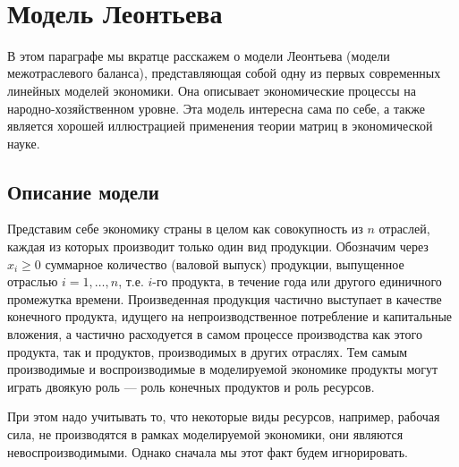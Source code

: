 \




\section{Модель Леонтьева}
    В этом параграфе мы вкратце расскажем о модели Леонтьева (модели
    межотраслевого баланса),
    представляющая собой одну из первых современных линейных моделей
    экономики. Она описывает экономические процессы на народно-хозяйственном
    уровне. Эта модель интересна сама по себе, а также является
    хорошей иллюстрацией применения теории матриц в экономической
    науке.



\subsection{Описание модели}
    Представим себе экономику страны в целом как совокупность  из $n$ отраслей,
    каждая из которых производит только один вид продукции.
    Обозначим через $x_{i}\geqslant0$ суммарное количество
    (валовой выпуск) продукции, выпущенное отраслью $i=1,\ldots,n$,
    т.е. $i$-го продукта,
    в течение года или другого единичного промежутка времени.
    Произведенная продукция частично выступает в качестве конечного продукта,
    идущего на непроизводственное потребление и капитальные
    вложения, а частично расходуется в самом процессе
    производства как этого продукта, так и продуктов, производимых в других отраслях.
    Тем самым производимые и воспроизводимые
    в моделируемой экономике продукты
    могут играть двоякую роль --- роль конечных продуктов и роль
    ресурсов.

    При этом надо учитывать то, что некоторые виды ресурсов,
    например, рабочая сила, не производятся в рамках моделируемой
    экономики, они являются невоспроизводимыми. Однако сначала мы
    этот факт будем игнорировать.


